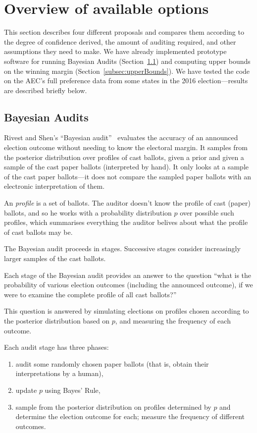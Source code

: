 \documentclass[10pt,a4paper]{article}
\begin{document}
\section{Overview of available options} \label{sec:options}
This section describes four different proposals and compares them according to the degree of confidence derived, the amount of auditing required, and other assumptions they need to make.  We have already implemented prototype software for running Bayesian Audits (Section~\ref{subsec:ShortBayesianAudits}) and computing upper bounds on the winning margin (Section~\ref{subsec:upperBounds}).  We have tested the code on the AEC's full preference data from some states in the 2016 election---results are described briefly below.  

\subsection{Bayesian Audits} \label{subsec:ShortBayesianAudits}
Rivest and Shen's ``Bayesian audit''~\cite{rivest2012bayesian} evaluates the accuracy of an announced
election outcome without needing to know the electoral margin.  It samples from the posterior distribution over
profiles of cast ballots, given a prior and given a sample of the
cast paper ballots (interpreted by hand).  It only looks at a
sample of the cast paper ballots---it does not compare the sampled
paper ballots with an electronic interpretation of them.

An \emph{profile} is a set of ballots.  The auditor doesn't know the
profile of cast (paper) ballots, and so he works with a probability
distribution $p$ over possible such profiles, which summarises everything
the auditor belives about what the profile of cast ballots may be.

The Bayesian audit proceeds in stages.  Successive stages consider
increasingly larger samples of the cast ballots.

Each stage of the Bayesian audit provides an answer to the question
``what is the probability
of various election outcomes (including the announced outcome),
if we were to examine the complete profile of all cast ballots?''

This question is answered by simulating elections on profiles chosen
according to the posterior distribution based on $p$, and
measuring the frequency of each outcome.

 Each audit stage has three phases:
\begin{enumerate}
\item audit some randomly chosen paper ballots
      (that is, obtain their interpretations by a human),
\item update $p$ using Bayes' Rule,
\item sample from the posterior distribution on profiles determined by $p$
  and determine the election outcome for each;
  measure the frequency of different outcomes.
\end{enumerate}
\end{document}
